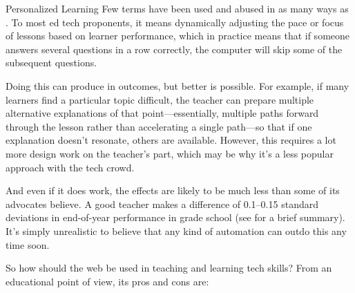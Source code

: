 \begin{aside}{Personalized Learning}
  Few terms have been used and abused in as many ways as
  . To most
  ed tech proponents, it means dynamically adjusting the pace or focus
  of lessons based on learner performance, which in practice means that
  if someone answers several questions in a row correctly, the computer
  will skip some of the subsequent questions.

  Doing this can produce  in outcomes, but
  better is possible. For example, if many learners find a particular
  topic difficult, the teacher can prepare multiple alternative
  explanations of that point---essentially, multiple paths forward
  through the lesson rather than accelerating a single path---so that
  if one explanation doesn't resonate, others are available. However,
  this requires a lot more design work on the teacher's part, which
  may be why it's a less popular approach with the tech crowd.

  And even if it does work, the effects are likely to be much less
  than some of its advocates believe. A good teacher makes a
  difference of 0.1--0.15 standard deviations in end-of-year
  performance in grade school \cite{Chet2014} (see  for a brief summary). It's simply
  unrealistic to believe that any kind of automation can outdo this
  any time soon.
\end{aside}

So how should the web be used in teaching and learning tech skills? From
an educational point of view, its pros and cons are:

